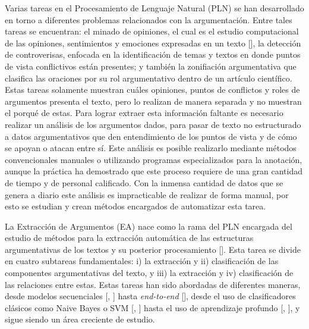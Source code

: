 Varias tareas en el Procesamiento de Lenguaje Natural (PLN) se han desarrollado en 
torno a diferentes problemas relacionados con 
la argumentación. Entre tales tareas se encuentran: el minado de opiniones, el cual es el 
estudio computacional de las opiniones, sentimientos y emociones expresadas en un texto 
[\cite{liu2010sentiment}], la detección de controverisas, enfocada en la identificación de 
temas y textos en donde puntos de vista conflictivos están presentes; y también la zonifiación
argumentativa que clasifica las oraciones por su rol argumentativo dentro de un artículo
científico. Estas tareas solamente muestran cuáles opiniones, puntos de conflictos y roles 
de argumentos 
presenta el texto, pero lo realizan de manera separada y no muestran el porqué de estas. 
Para lograr extraer esta información faltante es necesario realizar un 
análisis de los argumentos dados, para pasar de texto no estructurado a datos argumentativos 
que den entendimiento de los puntos de vista y de cómo se apoyan o atacan entre sí. Este análisis
es posible realizarlo mediante métodos convencionales manuales o utilizando programas
especializados para la anotación, aunque la práctica ha demostrado que este proceso requiere 
de una gran cantidad de tiempo y de personal calificado. Con la inmensa cantidad de datos 
que se genera a diario este análisis es impracticable de realizar de forma manual, por esto se 
estudian y crean métodos encargados de automatizar esta tarea.


La Extracción de Argumentos (EA) nace como la rama del PLN encargada
del estudio de métodos para la extracción automática de las estructuras argumentativas de 
los textos y su posterior procesamiento [\cite{lawrence2020argument}]. Esta tarea se divide en 
cuatro subtareas fundamentales: i) la extracción y ii) clasificación de las componentes 
argumentativas del texto, y iii) la extracción y 
iv) clasificación de las relaciones entre estas. Estas tareas han sido abordadas de diferentes maneras,
desde modelos secuenciales [\cite{palau2009argumentation}, \cite{goudas2015argument}] hasta 
\emph{end-to-end} [\cite{eger2017neural}], desde el uso de clasificadores clásicos 
como Naive Bayes o SVM [\cite{niculae2017argument}, \cite{stab2017parsing}] hasta el uso de 
aprendizaje profundo [\cite{galassi2021deep}, \cite{mayer2020transformer}], y sigue 
siendo un área creciente de estudio.

